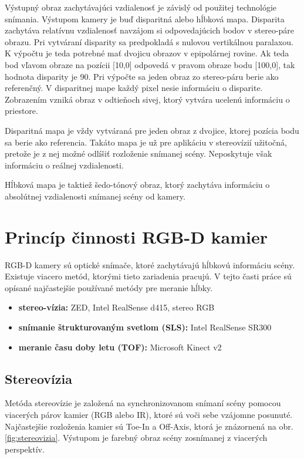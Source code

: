 Výstupný obraz zachytávajúci vzdialenosť je závislý od použitej technológie snímania.
Výstupom kamery je buď disparitná alebo hĺbková mapa.
Disparita zachytáva relatívnu vzdialenosť navzájom si odpovedajúcich bodov v stereo-páre
obrazu. Pri vytváraní disparity sa predpokladá s nulovou vertikálnou paralaxou. K výpočtu je teda potrebné mať dvojicu obrazov v epipolárnej rovine. Ak teda bod vľavom obraze na pozícii [10,0] odpovedá v pravom obraze bodu [100,0], tak hodnota disparity je 90. Pri výpočte sa jeden obraz zo stereo-páru berie ako referenčný.  
V disparitnej mape každý pixel nesie informáciu o disparite. Zobrazením vzniká obraz v odtieňoch sivej, ktorý vytvára ucelenú informáciu o priestore.

Disparitná mapa je vždy vytváraná pre jeden obraz z dvojice, ktorej pozícia bodu sa berie ako referencia. Takáto mapa je už pre aplikáciu v stereovízií užitočná, pretože je z nej možné odlíšiť rozloženie snímanej scény. Neposkytuje však informáciu o reálnej vzdialenosti.

Hĺbková mapa je taktiež šedo-tónový obraz, ktorý zachytáva informáciu o absolútnej
vzdialenosti snímanej scény od kamery. 

\section{Princíp činnosti RGB-D kamier}
\label{sec:rgbd:principles}
RGB-D kamery sú optické snímače, ktoré zachytávajú hĺbkovú informáciu scény. Existuje viacero metód, ktorými tieto zariadenia pracujú. V tejto časti práce sú opísané najčastejšie používané metódy pre meranie hĺbky.  

\begin{itemize}
	\item \textbf{stereo-vízia:} ZED, Intel RealSense d415, stereo RGB
	\item \textbf{snímanie štrukturovaným svetlom (SLS):} Intel RealSense SR300 
	\item \textbf{meranie času doby letu (TOF):} Microsoft Kinect v2 
\end{itemize}

\newpage
\subsection{Stereovízia}

Metóda stereovízie je založená na synchronizovanom snímaní scény pomocou viacerých párov kamier (RGB alebo IR), ktoré sú voči sebe vzájomne posunuté. Najčastejšie rozloženia kamier sú Toe-In a Off-Axis, ktorá je znázornená na obr. \ref{fig:stereovizia}. Výstupom je farebný obraz scény zosnímanej z viacerých perspektív.

